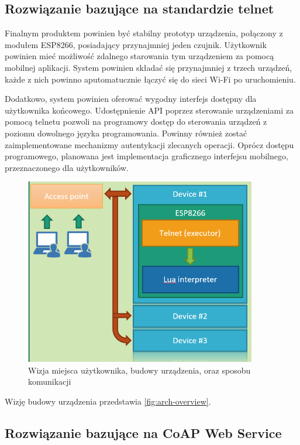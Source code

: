 \subsection{Rozwiązanie bazujące na standardzie telnet}
Finalnym produktem powinien być stabilny prototyp urządzenia, połączony z modułem ESP8266, posiadający przynajmniej jeden czujnik. Użytkownik powinien mieć możliwość zdalnego starowania tym urządzeniem za pomocą mobilnej aplikacji. System powinien składać się przynajmniej z trzech urządzeń, każde z nich powinno aputomatucznie łączyć się do sieci Wi-Fi po uruchomieniu. 

Dodatkowo, system powinien oferować wygodny interfejs dostępny dla użytkownika końcowego. Udostępnienie API poprzez sterowanie urządzeniami za pomocą telnetu pozwoli na programowy dostęp do sterowania urządzeń z poziomu dowolnego języka programowania. Powinny również zostać zaimplementowane mechanizmy autentykacji zlecanych operacji. Oprócz dostępu programowego, planowana jest implementacja graficznego interfejsu mobilnego, przeznaczonego dla użytkowników\cite{kukdm-art}.

\begin{figure}[!htbp]
	\centering
	\includegraphics[width=0.9\textwidth]{images/fig01-arch-overview.png}
	\caption[Wizja architektury systemu.]{Wizja miejsca użytkownika, budowy urządzenia, oraz sposobu komunikacji}
	\label{fig:arch-overview}
\end{figure}

Wizję budowy urządzenia przedstawia \autoref{fig:arch-overview}.

\subsection{Rozwiązanie bazujące na CoAP Web Service}

